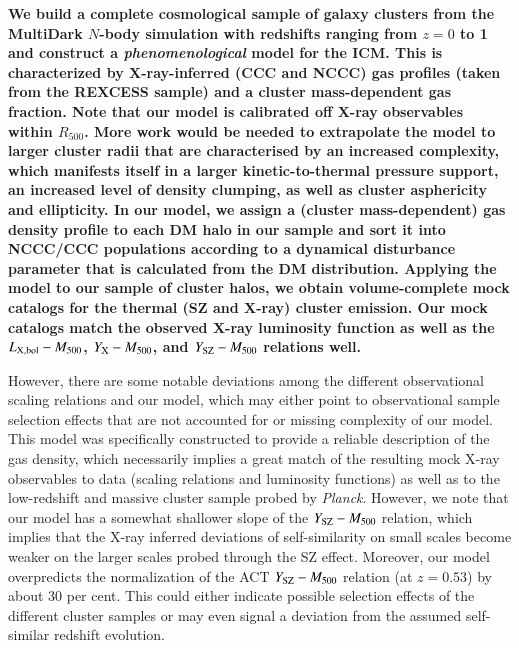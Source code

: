 \documentclass[useAMS,usenatbib]{mn2e}
\begin{document}
{\bf We build a complete cosmological sample of galaxy clusters from the
  MultiDark $N$-body simulation with redshifts ranging from $z = 0$ to 1 and
  construct a \emph{phenomenological} model for the ICM. This is characterized
  by X-ray-inferred (CCC and NCCC) gas profiles (taken from the REXCESS sample)
  and a cluster mass-dependent gas fraction. Note that our model is calibrated
  off X-ray observables within $R_{500}$. More work would be needed to
  extrapolate the model to larger cluster radii that are characterised by an
  increased complexity, which manifests itself in a larger kinetic-to-thermal
  pressure support, an increased level of density clumping, as well as cluster
  asphericity and ellipticity. In our model, we assign a (cluster
  mass-dependent) gas density profile to each DM halo in our sample and sort it
  into NCCC/CCC populations according to a dynamical disturbance parameter
  that is calculated from the DM distribution. Applying the model to our sample
  of cluster halos, we obtain volume-complete mock catalogs for the thermal (SZ
  and X-ray) cluster emission. Our mock catalogs match the observed X-ray
  luminosity function as well as the $L_{{\mathrm{X, bol}}}-M_{500}$,
  $Y_{{\mathrm{X}}}-M_{500}$, and $Y_{{\mathrm{SZ}}}-M_{500}$ relations well.

  However, there are some notable deviations among the different observational
  scaling relations and our model, which may either point to observational
  sample selection effects that are not accounted for or missing complexity of
  our model. This model was specifically constructed to provide a reliable
  description of the gas density, which necessarily implies a great match of the
  resulting mock X-ray observables to data (scaling relations and luminosity
  functions) as well as to the low-redshift and massive cluster sample probed by
  {\em Planck}. However, we note that our model has a somewhat shallower slope
  of the $Y_{{\mathrm{SZ}}}-M_{500}$ relation, which implies that the X-ray inferred
  deviations of self-similarity on small scales become weaker on the larger
  scales probed through the SZ effect. Moreover, our model overpredicts the
  normalization of the ACT $Y_{{\mathrm{SZ}}}-M_{500}$ relation (at $z=0.53$) by
  about 30 per cent. This could either indicate possible selection effects of
  the different cluster samples or may even signal a deviation from the assumed
  self-similar redshift evolution.

}
\end{document}
